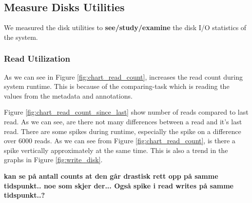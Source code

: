 \documentclass[USenglish]{uit-thesis}
\begin{document}
\subsection{Measure Disks Utilities}
We measured the disk utilities to \textbf{see/study/examine} the disk I/O statistics of the system.

\subsubsection{Read Utilization}
As we can see in Figure \ref{fig:chart_read_count}, increases the read count during system runtime. This is because of the comparing-task which is reading the values from the metadata and annotations.


Figure \ref{fig:chart_read_count_since_last} show number of reads compared to last read. As we can see, are there not many differences between a read and it's last read. There are some spikes during runtime, especially the spike on a difference over 6000 reads. As we can see from Figure \ref{fig:chart_read_count}, is there a spike vertically approximately at the same time. This is also a trend in the graphs in Figure \ref{fig:write_disk}.

\textbf{kan se på antall counts at den går drastisk rett opp på samme tidspunkt.. noe som skjer der... Også spike i read writes på samme tidspunkt..?}
\end{document}
